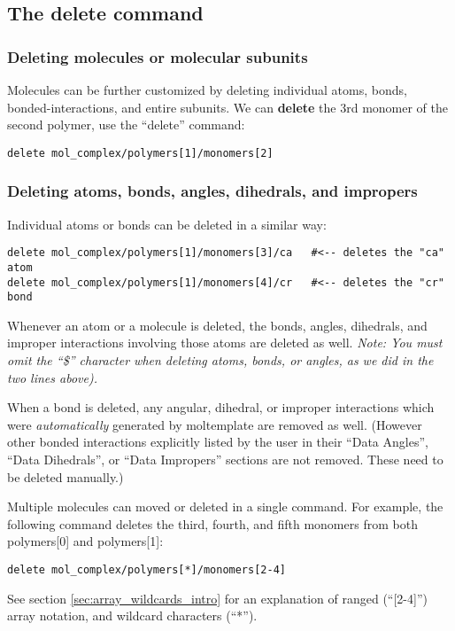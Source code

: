 \documentclass[11pt]{article}
\begin{document}
\subsection{The \textbf{delete} command}
\label{sec:delete}

\subsubsection{Deleting molecules or molecular subunits}
Molecules can be further customized by deleting 
individual atoms, bonds, bonded-interactions, and entire subunits.
We can \textbf{delete} the 3rd monomer of the second polymer, 
use the ``delete'' command:
\begin{verbatim}
delete mol_complex/polymers[1]/monomers[2]
\end{verbatim}

\subsubsection{Deleting atoms, bonds, angles, dihedrals, and impropers}
\label{sec:delete_atoms_bonds}
Individual atoms or bonds can be deleted in a similar way:
\begin{verbatim}
delete mol_complex/polymers[1]/monomers[3]/ca   #<-- deletes the "ca" atom
delete mol_complex/polymers[1]/monomers[4]/cr   #<-- deletes the "cr" bond
\end{verbatim}
Whenever an atom or a molecule is deleted, the bonds, angles, dihedrals, 
and improper interactions involving those atoms are deleted as well.
\textit{Note: You must omit the ``\$'' character when deleting atoms,
bonds, or angles, as we did in the two lines above).}



When a bond is deleted, any angular, dihedral, or improper 
interactions which were \textit{automatically} 
generated by moltemplate are removed as well.
(However other bonded interactions explicitly listed by the user in their
``Data Angles'', ``Data Dihedrals'', or ``Data Impropers'' sections
are not removed.  These need to be deleted manually.)

Multiple molecules can moved or deleted in a single command.  For example,
the following command deletes the third, fourth, and fifth monomers from 
both polymers[0] and polymers[1]:
\begin{verbatim}
delete mol_complex/polymers[*]/monomers[2-4]
\end{verbatim}
See section \ref{sec:array_wildcards_intro} for an
explanation of ranged (``[2-4]'') array notation, 
and wildcard characters (``*'').
\end{document}
